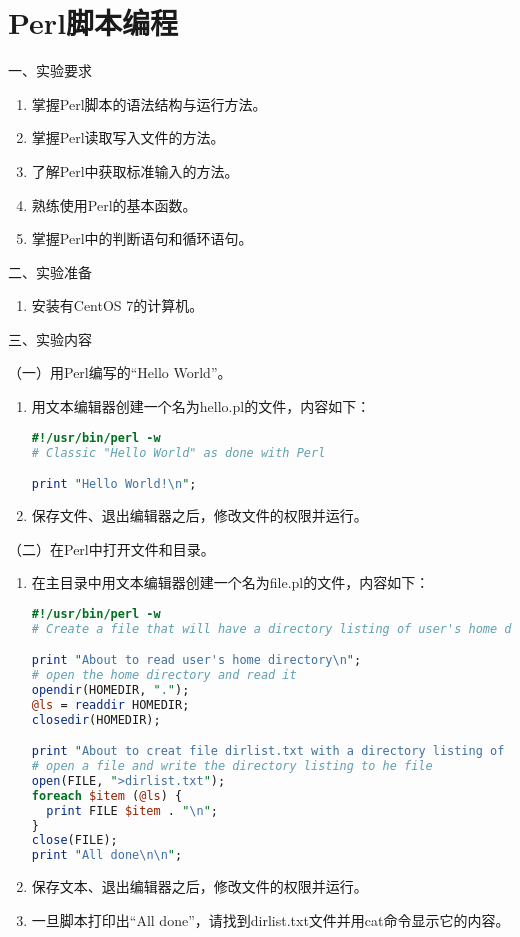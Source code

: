 \chapter{Perl脚本编程}

\noindent
一、实验要求
\begin{enumerate}
  \item 掌握Perl脚本的语法结构与运行方法。
  \item 掌握Perl读取写入文件的方法。
  \item 了解Perl中获取标准输入的方法。
  \item 熟练使用Perl的基本函数。
  \item 掌握Perl中的判断语句和循环语句。
\end{enumerate}

\vspace{0.2in}
\noindent
二、实验准备
\begin{enumerate}
  \item 安装有CentOS 7的计算机。
\end{enumerate}

\vspace{0.2in}
\noindent
三、实验内容

\vspace{0.1in}
（一）用Perl编写的``Hello World''。
\begin{enumerate}
  \item 用文本编辑器创建一个名为hello.pl的文件，内容如下：
\begin{lstlisting}[language=perl]
#!/usr/bin/perl -w
# Classic "Hello World" as done with Perl

print "Hello World!\n";
\end{lstlisting}
  \item 保存文件、退出编辑器之后，修改文件的权限并运行。
\end{enumerate}

\vspace{0.1in}
（二）在Perl中打开文件和目录。
\begin{enumerate}
  \item 在主目录中用文本编辑器创建一个名为file.pl的文件，内容如下：
\begin{lstlisting}[language=perl]
#!/usr/bin/perl -w
# Create a file that will have a directory listing of user's home dir

print "About to read user's home directory\n";
# open the home directory and read it
opendir(HOMEDIR, ".");
@ls = readdir HOMEDIR;
closedir(HOMEDIR);

print "About to creat file dirlist.txt with a directory listing of user's home dir\n";
# open a file and write the directory listing to he file
open(FILE, ">dirlist.txt");
foreach $item (@ls) {
  print FILE $item . "\n";
}
close(FILE);
print "All done\n\n";
\end{lstlisting}
  \item 保存文本、退出编辑器之后，修改文件的权限并运行。
  \item 一旦脚本打印出“All done”，请找到dirlist.txt文件并用cat命令显示它的内容。
\end{enumerate}

